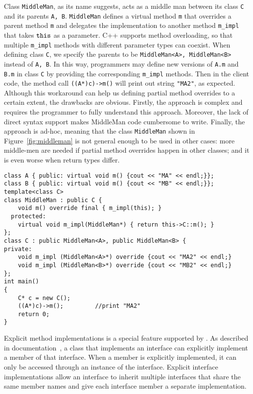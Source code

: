 Class \texttt{MiddleMan}, as its name suggests, acts as a middle man between its class \texttt{C} and its parents \texttt{A, B}. \texttt{MiddleMan} defines a virtual method \texttt{m} that overrides a parent method \texttt{m} and delegates the implementation to another method \texttt{m\_impl} that takes $\texttt{this}$ as a parameter. C++ supports method overloading, so that multiple \texttt{m\_impl} methods with different parameter types can coexist. When defining class \texttt{C}, we specify the parents to be \texttt{MiddleMan<A>, MiddleMan<B>} instead of \texttt{A, B}. In this way, programmers may define new versions of \texttt{A.m} and \texttt{B.m} in class \texttt{C} by providing the corresponding \texttt{m\_impl} methods. Then in the client code, the method call \texttt{((A*)c)->m()} will print out string \texttt{"MA2"}, as expected. Although this workaround can help us defining partial method overrides to a certain extent, the drawbacks are obvious. Firstly, the approach is complex and requires the programmer to fully understand this approach. Moreover, the lack of direct syntax support makes MiddleMan code cumbersome to write. Finally, the approach is ad-hoc, meaning that the class \texttt{MiddleMan} shown in Figure~\ref{fig:middleman} is not general enough to be used in other cases: more middle-men are needed if partial method overrides happen in other classes; and it is even worse when return types differ. 

\begin{figure*}[t]
\saveSpaceFig
\begin{lstlisting}
class A { public: virtual void m() {cout << "MA" << endl;}};
class B { public: virtual void m() {cout << "MB" << endl;}};
template<class C>
class MiddleMan : public C {
    void m() override final { m_impl(this); }
  protected:
    virtual void m_impl(MiddleMan*) { return this->C::m(); }
};
class C : public MiddleMan<A>, public MiddleMan<B> { 
private:
    void m_impl (MiddleMan<A>*) override {cout << "MA2" << endl;}
    void m_impl (MiddleMan<B>*) override {cout << "MB2" << endl;}
};
int main()
{
    C* c = new C();
    ((A*)c)->m();         //print "MA2"
    return 0;
}
\end{lstlisting}
\caption{The \emph{MiddleMan} approach.}
\label{fig:middleman}
\saveSpaceFig
\end{figure*}

Explicit method implementations is a special feature supported by
\csharp{}. As described in \csharp{} documentation~\cite{csharpdoc}, a
class that implements an interface can explicitly implement a member
of that interface. When a member is explicitly implemented, it can
only be accessed through an instance of the interface. Explicit
interface implementations allow an interface to inherit multiple 
interfaces that share the same member names and give each interface
member a separate implementation. 

